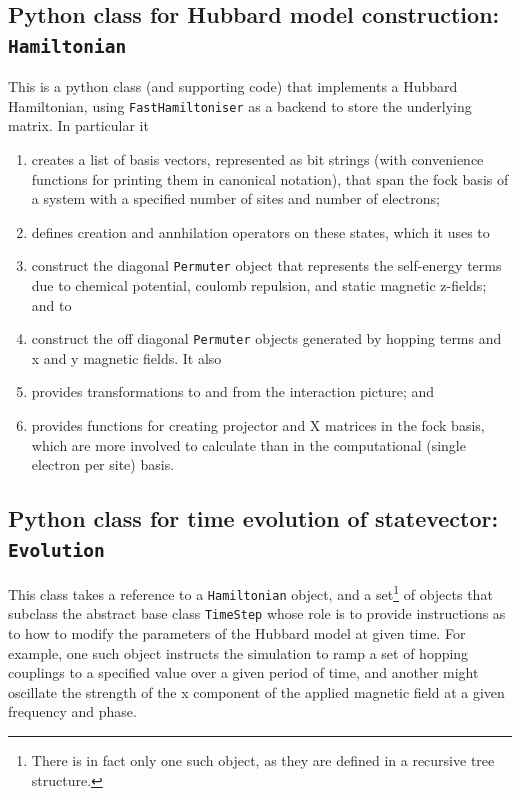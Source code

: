 \documentclass{report}
\begin{document}
\subsection{Python class for Hubbard model construction: \texttt{Hamiltonian}}
This is a python class (and supporting code) that implements a Hubbard Hamiltonian, using \texttt{FastHamiltoniser} as a backend to store the underlying matrix. In particular it
\begin{enumerate}
    \item creates a list of basis vectors, represented as bit strings (with convenience functions for printing them in canonical notation), that span the fock basis of a system with a specified number of sites and number of electrons;
    \item defines creation and annhilation operators on these states, which it uses to
    \item construct the diagonal \texttt{Permuter} object that represents the self-energy terms due to chemical potential, coulomb repulsion, and static magnetic z-fields; and to
    \item construct the off diagonal \texttt{Permuter} objects generated by hopping terms and x and y magnetic fields. It also
    \item provides transformations to and from the interaction picture; and
    \item provides functions for creating projector and X matrices in the fock basis, which are more involved to calculate than in the computational (single electron per site) basis. 
\end{enumerate}

\subsection{Python class for time evolution of statevector: \texttt{Evolution}}

This class takes a reference to a \texttt{Hamiltonian} object, and a set\footnote{There is in fact only one such object, as they are defined in a recursive tree structure.} of objects that subclass the abstract base class \texttt{TimeStep} whose role is to provide instructions as to how to modify the parameters of the Hubbard model at given time. For example, one such object instructs the simulation to ramp a set of hopping couplings to a specified value over a given period of time, and another might oscillate the strength of the x component of the applied magnetic field at a given frequency and phase.
\end{document}
